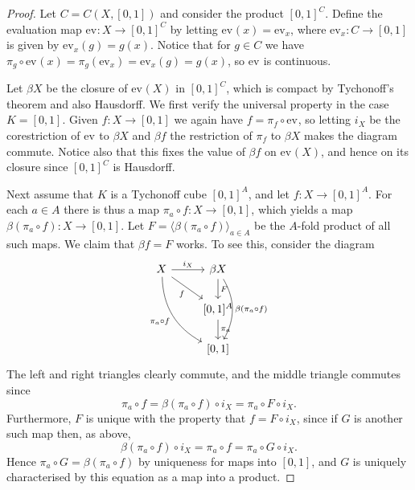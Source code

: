 \documentclass[article, a4paper, 11pt, oneside]{memoir}
\numberwithin{equation}{chapter}
\begin{document}
\newcommand{\ev}[1][]{\mathrm{ev}_{#1}}

\begin{proof}
    Let $C = C(X,[0,1])$ and consider the product $[0,1]^C$. Define the evaluation map $\ev \colon X \to [0,1]^C$ by letting $\ev(x) = \ev[x]$, where $\ev[x] \colon C \to [0,1]$ is given by $\ev[x](g) = g(x)$. Notice that for $g \in C$ we have $\pi_g \circ \ev(x) = \pi_g(\ev[x]) = \ev[x](g) = g(x)$, so $\ev$ is continuous.

    Let $\beta X$ be the closure of $\ev(X)$ in $[0,1]^C$, which is compact by Tychonoff's theorem and also Hausdorff. We first verify the universal property in the case $K = [0,1]$. Given $f \colon X \to [0,1]$ we again have $f = \pi_f \circ \ev$, so letting $i_X$ be the corestriction of $\ev$ to $\beta X$ and $\beta f$ the restriction of $\pi_f$ to $\beta X$ makes the diagram commute. Notice also that this fixes the value of $\beta f$ on $\ev(X)$, and hence on its closure since $[0,1]^C$ is Hausdorff.

    Next assume that $K$ is a Tychonoff cube $[0,1]^A$, and let $f \colon X \to [0,1]^A$. For each $a \in A$ there is thus a map $\pi_a \circ f \colon X \to [0,1]$, which yields a map $\beta(\pi_a \circ f) \colon X \to [0,1]$. Let $F = \langle \beta(\pi_a \circ f) \rangle_{a \in A}$ be the $A$-fold product of all such maps. We claim that $\beta f = F$ works. To see this, consider the diagram
    \begin{equation*}
        \begin{tikzcd}
            X
                \ar[r, "i_X"]
                \ar[dr, "f", swap]
                \ar[ddr, "\pi_a \circ f", swap, bend right]
            & \beta X
                \ar[d, "F"]
                \ar[dd, "\beta(\pi_a \circ f)", bend left]
            \\
            & {[0,1]^A}
                \ar[d, "\pi_a"]
            \\
            & {[0,1]}
        \end{tikzcd}
    \end{equation*}
    The left and right triangles clearly commute, and the middle triangle commutes since
    \begin{equation*}
        \pi_a \circ f
            = \beta(\pi_a \circ f) \circ i_X
            = \pi_a \circ F \circ i_X.
    \end{equation*}
    Furthermore, $F$ is unique with the property that $f = F \circ i_X$, since if $G$ is another such map then, as above,
    \begin{equation*}
        \beta(\pi_a \circ f) \circ i_X
            = \pi_a \circ f
            = \pi_a \circ G \circ i_X.
    \end{equation*}
    Hence $\pi_a \circ G = \beta(\pi_a \circ f)$ by uniqueness for maps into $[0,1]$, and $G$ is uniquely characterised by this equation as a map into a product.


\end{proof}
\end{document}

